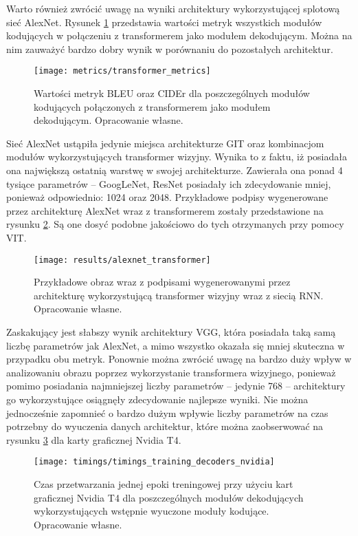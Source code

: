 Warto również zwrócić uwagę na wyniki architektury wykorzystującej splotową sieć AlexNet. Rysunek \ref{fig:metrics-transformer} przedstawia wartości metryk wszystkich modułów kodujących w połączeniu z transformerem jako modułem dekodującym. Można na nim zauważyć bardzo dobry wynik w porównaniu do pozostałych architektur.
\begin{figure}[H]
    \centering
    \texttt{[image: metrics/transformer\_metrics]}
    \caption{Wartości metryk BLEU oraz CIDEr dla poszczególnych modułów kodujących połączonych z transformerem jako modułem dekodującym. Opracowanie własne.}
    \label{fig:metrics-transformer}
\end{figure}
\noindent Sieć AlexNet ustąpiła jedynie miejsca architekturze GIT oraz kombinacjom modułów wykorzystujących transformer wizyjny. Wynika to z faktu, iż posiadała ona największą ostatnią warstwę w swojej architekturze. Zawierała ona ponad 4 tysiące parametrów -- GoogLeNet, ResNet posiadały ich zdecydowanie mniej, ponieważ odpowiednio: 1024 oraz 2048. Przykładowe podpisy wygenerowane przez architekturę AlexNet wraz z transformerem zostały przedstawione na rysunku \ref{fig:results-alexnet-transformer}. Są one dosyć podobne jakościowo do tych otrzymanych przy pomocy VIT.
\begin{figure}[H]
    \centering
    \texttt{[image: results/alexnet\_transformer]}
    \caption{Przykładowe obraz wraz z podpisami wygenerowanymi przez architekturę wykorzystującą transformer wizyjny wraz z siecią RNN. Opracowanie własne.}
    \label{fig:results-alexnet-transformer}
\end{figure}
\noindent Zaskakujący jest słabszy wynik architektury VGG, która posiadała taką samą liczbę parametrów jak AlexNet, a mimo wszystko okazała się mniej skuteczna w przypadku obu metryk. Ponownie można zwrócić uwagę na bardzo duży wpływ w analizowaniu obrazu poprzez wykorzystanie transformera wizyjnego, ponieważ pomimo posiadania najmniejszej liczby parametrów -- jedynie 768 -- architektury go wykorzystujące osiągnęły zdecydowanie najlepsze wyniki. Nie można jednocześnie zapomnieć o bardzo dużym wpływie liczby parametrów na czas potrzebny do wyuczenia danych architektur, które można zaobserwować na rysunku \ref{fig:timings-training-decoders-nvidia} dla karty graficznej Nvidia T4.
\begin{figure}[H]
    \centering
    \texttt{[image: timings/timings\_training\_decoders\_nvidia]}
    \caption{Czas przetwarzania jednej epoki treningowej przy użyciu kart graficznej Nvidia T4 dla poszczególnych modułów dekodujących wykorzystujących wstępnie wyuczone moduły kodujące. Opracowanie własne.}
    \label{fig:timings-training-decoders-nvidia}
\end{figure}
